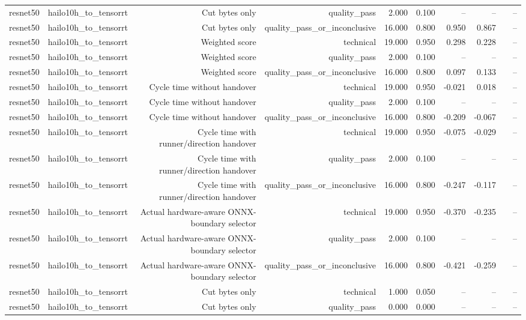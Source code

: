 \begin{table}[t]
\begin{tabular}{lrrrrrrrrr}
resnet50 & hailo10h\_to\_tensorrt & Cut bytes only & quality\_pass & 2.000 & 0.100 & -- & -- &  & -- \\
resnet50 & hailo10h\_to\_tensorrt & Cut bytes only & quality\_pass\_or\_inconclusive & 16.000 & 0.800 & 0.950 & 0.867 &  & -- \\
resnet50 & hailo10h\_to\_tensorrt & Weighted score & technical & 19.000 & 0.950 & 0.298 & 0.228 &  & -- \\
resnet50 & hailo10h\_to\_tensorrt & Weighted score & quality\_pass & 2.000 & 0.100 & -- & -- &  & -- \\
resnet50 & hailo10h\_to\_tensorrt & Weighted score & quality\_pass\_or\_inconclusive & 16.000 & 0.800 & 0.097 & 0.133 &  & -- \\
resnet50 & hailo10h\_to\_tensorrt & Cycle time without handover & technical & 19.000 & 0.950 & -0.021 & 0.018 &  & -- \\
resnet50 & hailo10h\_to\_tensorrt & Cycle time without handover & quality\_pass & 2.000 & 0.100 & -- & -- &  & -- \\
resnet50 & hailo10h\_to\_tensorrt & Cycle time without handover & quality\_pass\_or\_inconclusive & 16.000 & 0.800 & -0.209 & -0.067 &  & -- \\
resnet50 & hailo10h\_to\_tensorrt & Cycle time with runner/direction handover & technical & 19.000 & 0.950 & -0.075 & -0.029 &  & -- \\
resnet50 & hailo10h\_to\_tensorrt & Cycle time with runner/direction handover & quality\_pass & 2.000 & 0.100 & -- & -- &  & -- \\
resnet50 & hailo10h\_to\_tensorrt & Cycle time with runner/direction handover & quality\_pass\_or\_inconclusive & 16.000 & 0.800 & -0.247 & -0.117 &  & -- \\
resnet50 & hailo10h\_to\_tensorrt & Actual hardware-aware ONNX-boundary selector & technical & 19.000 & 0.950 & -0.370 & -0.235 &  & -- \\
resnet50 & hailo10h\_to\_tensorrt & Actual hardware-aware ONNX-boundary selector & quality\_pass & 2.000 & 0.100 & -- & -- &  & -- \\
resnet50 & hailo10h\_to\_tensorrt & Actual hardware-aware ONNX-boundary selector & quality\_pass\_or\_inconclusive & 16.000 & 0.800 & -0.421 & -0.259 &  & -- \\
resnet50 & hailo10h\_to\_tensorrt & Cut bytes only & technical & 1.000 & 0.050 & -- & -- &  & -- \\
resnet50 & hailo10h\_to\_tensorrt & Cut bytes only & quality\_pass & 0.000 & 0.000 & -- & -- &  & -- \\

\end{tabular}
\end{table}
